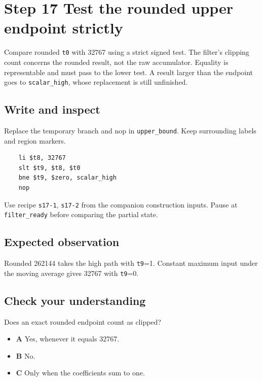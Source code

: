 \section{Step 17 Test the rounded upper endpoint strictly}\label{fir-s17}

Compare rounded \texttt{t0} with 32767 using a strict signed test. The filter’s clipping count concerns the rounded result, not the raw accumulator. Equality is representable and must pass to the lower test. A result larger than the endpoint goes to \texttt{scalar\_high}, whose replacement is still unfinished.

\subsection{Write and inspect}
Replace the temporary branch and nop in \texttt{upper\_bound}. Keep surrounding labels and region markers.

\begin{verbatim}
    li $t8, 32767
    slt $t9, $t8, $t0
    bne $t9, $zero, scalar_high
    nop
\end{verbatim}
Use recipe \texttt{s17-1}, \texttt{s17-2} from the companion construction inputs. Pause at \texttt{filter\_ready} before comparing the partial state.

\subsection{Expected observation}
Rounded 262144 takes the high path with \texttt{t9}=1. Constant maximum input under the moving average gives 32767 with \texttt{t9}=0.

\subsection{Check your understanding}
Does an exact rounded endpoint count as clipped?

\begin{itemize}
  \item \textbf{A} Yes, whenever it equals 32767.
  \item \textbf{B} No.
  \item \textbf{C} Only when the coefficients sum to one.
\end{itemize}
